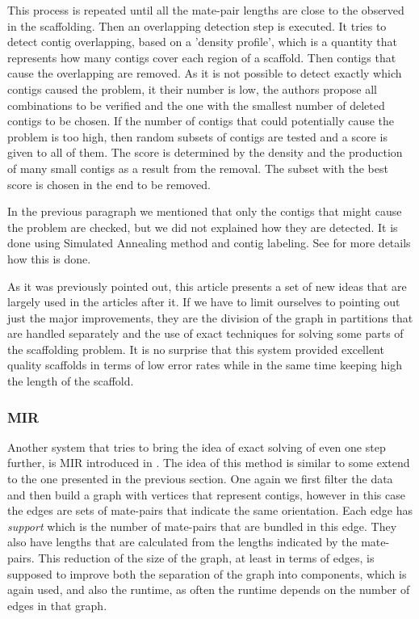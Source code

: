 \documentclass[11pt]{article}
\begin{document}
This process is repeated until all the mate-pair lengths are close to the
observed in the scaffolding. Then an overlapping detection step is executed. It
tries to detect contig overlapping, based on a 'density profile', which is a
quantity that represents how many contigs cover each region of a scaffold. Then
contigs that cause the overlapping are removed. As it is not possible to detect
exactly which contigs caused the problem, it their number is low, the authors
propose all combinations to be verified and the one with the smallest number of
deleted contigs to be chosen. If the number of contigs that could potentially
cause the problem is too high, then random subsets of contigs are tested and a
score is given to all of them. The score is determined by the density and the
production of many small contigs as a result from the removal. The subset with
the best score is chosen in the end to be removed.

In the previous paragraph we mentioned that only the contigs that might cause
the problem are checked, but we did not explained how they are detected. It is
done using Simulated Annealing method and contig labeling. See \cite{SOPRA} for
more details how this is done.

As it was previously pointed out, this article presents a set of new ideas that
are largely used in the articles after it. If we have to limit ourselves to
pointing out just the major improvements, they are the division of the graph in
partitions that are handled separately and the use of exact techniques for
solving some parts of the scaffolding problem. It is no surprise that this
system provided excellent quality scaffolds in terms of low error rates while in
the same time keeping high the length of the scaffold.

\subsubsection{MIR} %
\label{ssub:MIR}
Another system that tries to bring the idea of exact solving of even one step
further, is MIR introduced in \cite{MIR}. The idea of this method is similar to
some extend to the one presented in the previous section. One again we first
filter the data and then build a graph with vertices that represent contigs,
however in this case the edges are sets of mate-pairs that indicate the same
orientation. Each edge has \emph{support} which is the number of mate-pairs that
are bundled in this edge.  They also have lengths that are calculated from the
lengths indicated by the mate-pairs. This reduction of the size of the graph, at
least in terms of edges, is supposed to improve both the separation of the graph
into components, which is again used, and also the runtime, as often the runtime
depends on the number of edges in that graph.
\end{document}
